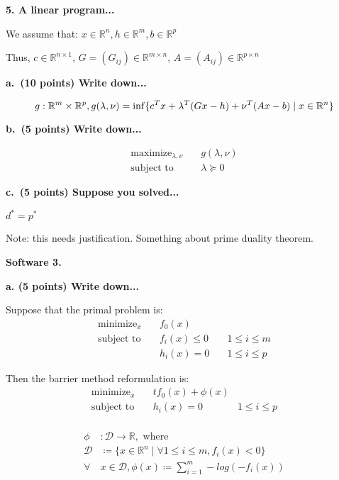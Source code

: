 \documentclass[a4paper,10pt]{article}
\theoremstyle{definition}
\begin{document}
\bigskip
\textbf{5. A linear program...}

We assume that:
$x \in \mathbb{R}^n, h \in \mathbb{R}^m, b \in \mathbb{R}^p$

Thus, $c \in \mathbb{R}^{n \times 1}$, $G = (G_{ij}) \in \mathbb{R}^{m \times n}$, $A = (A_{ij}) \in \mathbb{R}^{p \times n}$

\textbf{a. (10 points) Write down...}

\[
    g:\mathbb{R}^m \times \mathbb{R}^p, \\
    g(\lambda, \nu) = \inf\{
        c^Tx + \lambda^{T}(Gx - h) + \nu^{T}(Ax - b)
        \mid x\in\mathbb{R}^n
    \}
\]

\textbf{b. (5 points) Write down...}

\[
\begin{aligned}
    \text{maximize}_{\lambda, \nu} \quad & g(\lambda, \nu) \\
    \text{subject to} \quad & \lambda \succeq 0
\end{aligned}
\]


\textbf{c. (5 points) Suppose you solved...}

$d^* = p^*$

Note: this needs justification. Something about prime duality theorem.



\textbf{Software 3. }

\textbf{a. (5 points) Write down...}

Suppose that the primal problem is:
\[
\begin{aligned}
    \text{minimize}_{x} \quad & f_0(x) \\
    \text{subject to} \quad & f_i(x) \leq 0 \quad & 1 \leq i \leq m\\
                            & h_i(x) = 0    \quad & 1 \leq i \leq p 
\end{aligned}
\]

Then the barrier method reformulation is: 
\[
\begin{aligned}
    \text{minimize}_{x} \quad & tf_0(x) + \phi(x)\\
    \text{subject to} \quad & h_i(x) = 0 \quad & 1 \leq i \leq p\\
\end{aligned}
\]

\[
\begin{aligned}
    \phi & : \mathcal{D} \rightarrow \mathbb{R}, \text{ where }\\
    \mathcal{D} & \coloneq \{x \in \mathbb{R} ^ n \mid \forall 1\leq i\leq m, f_i(x) < 0\}\\
    \forall & x \in \mathcal{D}, \phi(x) \coloneq \sum_{i=1}^{m} -log(-f_i(x))
\end{aligned}
\]
\end{document}
